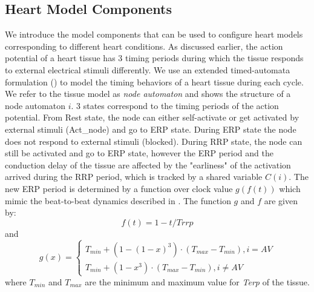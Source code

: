 \subsection{Heart Model Components}
We introduce the model components that can be used to configure heart models corresponding to different heart conditions. As discussed earlier, the action potential of a heart tissue has 3 timing periods during which the tissue responds to external electrical stimuli differently. We use an extended timed-automata formulation (\cite{timed_automata}) to model the timing behaviors of a heart tissue during each cycle. We refer to the tissue model as \emph{node automaton} and  shows the structure of a node automaton $i$. 3 states correspond to the timing periods of the action potential. From \textsf{Rest} state, the node can either self-activate or get activated by external stimuli (Act\_node) and go to \textsf{ERP} state. During \textsf{ERP} state the node does not respond to external stimuli (blocked). During \textsf{RRP} state, the node can still be activated and go to \textsf{ERP} state, however the ERP period and the conduction delay of the tissue are affected by the "earliness" of the activation arrived during the RRP period, which is tracked by a shared variable $C(i)$. The new ERP period is determined by a function over clock value $g(f(t))$ which mimic the beat-to-beat dynamics described in \cite{josephson}. The function $g$ and $f$ are given by:
\begin{equation} \label{factor}
						f(t) = 1-t/Trrp
						\end{equation}
and
\begin{equation} \label{earliness_noAV}
						g(x) = \left\{
						\begin{array}{lr}
						
						T_{min}+(1-(1-x)^3)\cdot (T_{max}-T_{min}), i=AV\\
						T_{min}+(1-x^3)\cdot (T_{max}-T_{min}),i\neq AV
			
						
						\end{array}
						\right.
						\end{equation}  
where $T_{min}$ and $T_{max}$ are the minimum and maximum value for \emph{Terp} of the tissue.
